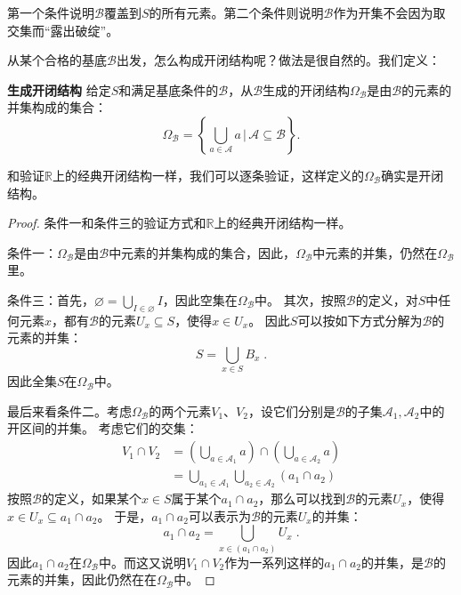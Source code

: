 \documentclass[12pt,UTF8,fontset=none]{ctexbook}
\begin{document}
\begin{appendix}
第一个条件说明$\mathcal{B}$覆盖到$S$的所有元素。第二个条件则说明$\mathcal{B}$作为开集不会因为取交集而“露出破绽”。

从某个合格的基底$\mathcal{B}$出发，怎么构成开闭结构呢？做法是很自然的。我们定义：
\begin{df}{\textbf{生成开闭结构}}
    给定$S$和满足基底条件的$\mathcal{B}$，从$\mathcal{B}$生成的开闭结构$\Omega_{\mathcal{B}}$是由$\mathcal{B}$的元素的并集构成的集合：
    $$ \Omega_{\mathcal{B}} =\left\{\bigcup_{a \in \mathcal{A}} a \, \Bigg| \,\mathcal{A} \subseteq  \mathcal{B} \right\}.  $$
\end{df}

和验证$\mathbb{R}$上的经典开闭结构一样，我们可以逐条验证，这样定义的$\Omega_{\mathcal{B}}$确实是开闭结构。

\begin{proof}
    条件一和条件三的验证方式和$\mathbb{R}$上的经典开闭结构一样。

    条件一：$\Omega_{\mathcal{B}}$是由$\mathcal{B}$中元素的并集构成的集合，因此，$\Omega_{\mathcal{B}}$中元素的并集，仍然在$\Omega_{\mathcal{B}}$里。

    条件三：首先，$\varnothing = \bigcup_{I \in \varnothing} I $，因此空集在$\Omega_{\mathcal{B}}$中。
    其次，按照$\mathcal{B}$的定义，对$S$中任何元素$x$，都有$\mathcal{B}$的元素$U_x\subseteq S$，使得$x\in U_x$。
    因此$S$可以按如下方式分解为$\mathcal{B}$的元素的并集：
    $$ S = \bigcup_{x\in S} B_x \;. $$
    因此全集$S$在$\Omega_{\mathcal{B}}$中。

    最后来看条件二。考虑$\Omega_{\mathcal{B}}$的两个元素$V_1$、$V_2$，设它们分别是$\mathcal{B}$的子集$\mathcal{A}_1, \mathcal{A}_2$中的开区间的并集。
    考虑它们的交集：
    \begin{align*}
        V_1\cap V_2 &= \left(\bigcup_{a \in \mathcal{A}_1} a\right) \cap \left(\bigcup_{a \in \mathcal{A}_2} a\right) \\
        &= \bigcup_{a_1 \in \mathcal{A}_1} \bigcup_{a_2 \in \mathcal{A}_2} (a_1 \cap a_2)   
    \end{align*}
    按照$\mathcal{B}$的定义，如果某个$x\in S$属于某个$a_1 \cap a_2$，那么可以找到$\mathcal{B}$的元素$U_x$，使得$x\in U_x \subseteq a_1\cap a_2$。
    于是，$a_1 \cap a_2$可以表示为$\mathcal{B}$的元素$U_x$的并集：
    $$ a_1 \cap a_2 = \bigcup_{x\in (a_1 \cap a_2)} U_x \;. $$
    因此$a_1 \cap a_2$在$\Omega_{\mathcal{B}}$中。而这又说明$V_1\cap V_2$作为一系列这样的$a_1 \cap a_2$的并集，是$\mathcal{B}$的元素的并集，因此仍然在在$\Omega_{\mathcal{B}}$中。

\end{proof}


\end{appendix}
\end{document}
